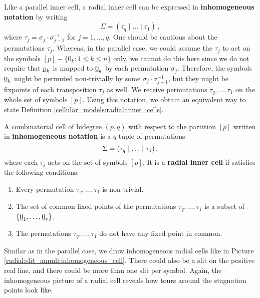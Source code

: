 Like a parallel inner cell, a radial inner cell can be expressed in \textbf{inhomogeneous notation} by writing
\[
    \Sigma = (\tau_q \mid \ldots \mid \tau_1)\,,
\]
where $\tau_j = \sigma_j \cdot \sigma_{j-1}^{-1}$ for $j = 1, \dotsc, q$. 
One should be cautious about the permutations $\tau_j$.
Whereas, in the parallel case, we could assume the $\tau_j$ to act on the symbols $[p] - \{0_k \colon 1 \leq k \leq n\}$ only,
we cannot do this here since we do not require that $\underline{\smash{p}}_k$ is mapped to $\underline{\smash{0}}_k$ by each permutation $\sigma_j$.
Therefore, the symbols $\underline{\smash{0}}_k$ might be permuted non-trivially by some $\sigma_j \cdot \sigma_{j-1}^{-1}$, 
but they might be fixpoints of each transposition $\tau_j$ as well.
We receive permutations $\tau_q, \dotsc, \tau_1$ on the whole set of symbols $[p]$.
Using this notation, we obtain an equivalent way to state Definition \ref{cellular_models:radial:inner_cells}.

\begin{defi}
    \label{cellular_models:radial:inhomogeneous_notation}
    A combinatorial cell of bidegree $(p,q)$ with respect to the partition $[p]$ written in {\bfseries inhomogeneous notation}
    is a $q$-tuple of permutations
    \[
        \Sigma = \inhomq \,,
    \]
    where each $\tau_j$ acts on the set of symbols $[p]$.
    It is a {\bfseries radial inner cell} if satisfies the following conditions:
    \begin{enumerate}
        \item Every permutation $\tau_q, \ldots, \tau_1$ is non-trivial.
        \item The set of common fixed points of the permutations $\tau_q, \ldots, \tau_1$ is a subset of $\{ \ul0_1, \ldots, \ul0_r\}$.
        \item The permutations $\tau_q, \ldots, \tau_1$ do not have any fixed point in common.
    \end{enumerate}
\end{defi}

Similar as in the parallel case, we draw inhomogeneous radial cells like in Picture \ref{radial:slit_annuli:inhomogeneous_cell}.
There could also be a slit on the positive real line, and there could be more than one slit per symbol.
Again, the inhomogeneous picture of a radial cell reveals how tours around the stagnation points look like.

